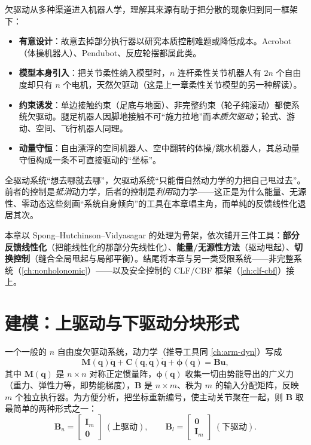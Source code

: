 欠驱动从多种渠道进入机器人学，理解其来源有助于把分散的现象归到同一框架下：
\begin{itemize}
  \item \textbf{有意设计}：故意去掉部分执行器以研究本质控制难题或降低成本。Acrobot（体操机器人）、Pendubot、反应轮摆都属此类。
  \item \textbf{模型本身引入}：把关节柔性纳入模型时，$n$ 连杆柔性关节机器人有 $2n$ 个自由度却只有 $n$ 个电机，天然欠驱动（这是上一章柔性关节模型的另一种解读）。
  \item \textbf{约束诱发}：单边接触约束（足底与地面）、非完整约束（轮子纯滚动）都使系统欠驱动。腿足机器人因脚地接触不可“施力拉地”而\emph{本质欠驱动}；轮式、游动、空间、飞行机器人同理。
  \item \textbf{动量守恒}：自由漂浮的空间机器人、空中翻转的体操/跳水机器人，其总动量守恒构成一条不可直接驱动的“坐标”。
\end{itemize}

\begin{insight}[一句话抓住难点]
全驱动系统“想去哪就去哪”，欠驱动系统“只能借自然动力学的力把自己甩过去”。前者的控制是\emph{抵消}动力学，后者的控制是\emph{利用}动力学——这正是为什么能量、无源性、零动态这些刻画“系统自身倾向”的工具在本章唱主角，而单纯的反馈线性化退居其次。
\end{insight}

本章以 Spong--Hutchinson--Vidyasagar 的处理为骨架，依次铺开三件工具：\textbf{部分反馈线性化}（把能线性化的那部分先线性化）、\textbf{能量/无源性方法}（驱动甩起）、\textbf{切换控制}（缝合全局甩起与局部平衡）。结尾将本章与另一类受限系统——非完整系统（\cref{ch:nonholonomic}）——以及安全控制的 CLF/CBF 框架（\cref{ch:clf-cbf}）接上。

\section{建模：上驱动与下驱动分块形式}\label{sec:ua-model}

一个一般的 $n$ 自由度欠驱动系统，动力学（推导工具同 \cref{ch:arm-dyn}）写成
\begin{equation}\label{eq:ua-dyn}
  \mathbf{M}(\mathbf{q})\ddot{\mathbf{q}}+\mathbf{C}(\mathbf{q},\dot{\mathbf{q}})\dot{\mathbf{q}}+\boldsymbol{\phi}(\mathbf{q})=\mathbf{B}\mathbf{u},
\end{equation}
其中 $\mathbf{M}(\mathbf{q})$ 是 $n\times n$ 对称正定惯量阵，$\boldsymbol{\phi}(\mathbf{q})$ 收集一切由势能导出的广义力（重力、弹性力等，即势能梯度），$\mathbf{B}$ 是 $n\times m$、秩为 $m$ 的输入分配矩阵，反映 $m$ 个独立执行器。为方便分析，把坐标重新编号，使主动关节聚在一起，则 $\mathbf{B}$ 取最简单的两种形式之一：
\begin{equation}\label{eq:ua-Bform}
  \mathbf{B}_u=\begin{bmatrix}\mathbf{I}_m\\\mathbf{0}\end{bmatrix}\ (\text{上驱动}),\qquad
  \mathbf{B}_l=\begin{bmatrix}\mathbf{0}\\\mathbf{I}_m\end{bmatrix}\ (\text{下驱动}).
\end{equation}

